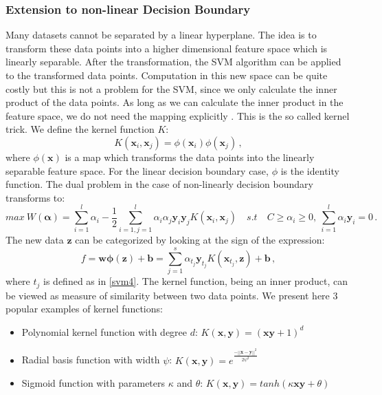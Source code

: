 \documentclass[a4paper,11pt,oneside]{article}
\begin{document}
\subsubsection*{Extension to non-linear Decision Boundary}
Many datasets cannot be separated by a linear hyperplane. The idea is to transform these data points
into a higher dimensional feature space which is linearly separable. After the transformation, the SVM algorithm can be applied to the transformed data points.
Computation in this new space can be quite costly but this is not a problem for the SVM, since we only calculate the inner product 
of the data points. As long as we can calculate the inner product in the feature space, we do not need the mapping explicitly \cite{law2006simple}.
This is the so called kernel trick. We define the kernel function $K$:
\begin{equation}
  K(\mathbf{x}_i,\mathbf{x}_j) = \phi(\mathbf{x}_i)\phi(\mathbf{x}_j)\,,
\end{equation} where $\phi(\mathbf{x})$ is a map which transforms the data points into the linearly separable feature space.
For the linear decision boundary case, $\phi$ is the identity function. The dual problem in the case of non-linearly decision boundary
transforms to:
\begin{equation}\label{svm5}
  max \ W(\mathbf{\alpha}) = \sum_{i=1}^l \alpha_i - \frac{1}{2} \sum_{i=1,j=1}^l \alpha_i \alpha_j \mathbf{y}_i\mathbf{y}_jK(\mathbf{x}_i,\mathbf{x}_j)
  \quad s.t \quad C\geq\alpha_i \geq 0,\ \sum_{i=1}^l \alpha_i\mathbf{y}_i = 0\,.
\end{equation}
The new data $\mathbf{z}$ can be categorized by looking at the sign of the expression:
\begin{equation}\label{svm6}
  f = \mathbf{w}\mathbf{\phi(z)}+\mathbf{b} = \sum_{j=1}^s \alpha_{t_j}\mathbf{y}_{t_j}K(\mathbf{x}_{t_j},\mathbf{z})+\mathbf{b}\,, 
\end{equation} where $t_j$ is defined as in \ref{svm4}.
The kernel function, being an inner product, can be viewed as measure of similarity between two data points.
We present here 3 popular examples of kernel functions:
\begin{itemize}
  \item Polynomial kernel function with degree $d$:
  \begin{math}
    K(\mathbf{x},\mathbf{y}) = (\mathbf{x}\mathbf{y} + 1)^d
  \end{math}
  \item Radial basis function with width $\psi$:
  \begin{math}
    K(\mathbf{x},\mathbf{y}) = e^{\frac{-||\mathbf{x}-\mathbf{y}||^2}{2\psi^2}}
  \end{math}
  \item Sigmoid function with parameters $\kappa$ and $\theta$: 
  \begin{math}
    K(\mathbf{x},\mathbf{y}) = tanh(\kappa \mathbf{x} \mathbf{y}+\theta)
  \end{math}
\end{itemize}
\end{document}
